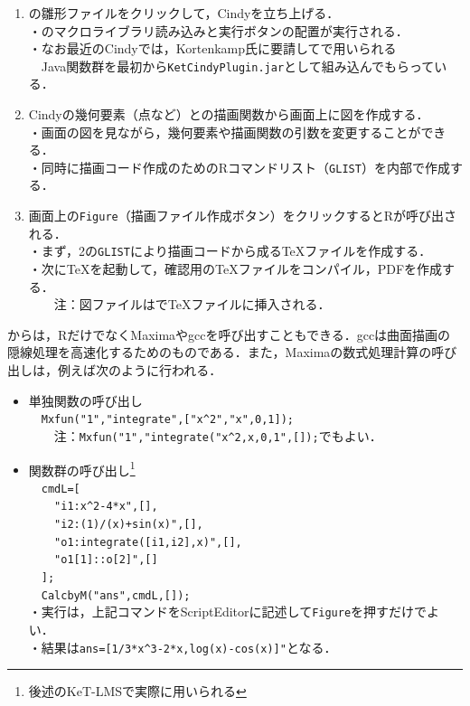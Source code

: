 \documentclass[a4j,12pt]{ujarticle}
\begin{document}
\begin{enumerate}
\item \ketcindy の雛形ファイルをクリックして，Cindyを立ち上げる．\\
・\ketcindy のマクロライブラリ読み込みと実行ボタンの配置が実行される．\\
・なお最近のCindyでは，Kortenkamp氏に要請して\ketcindy で用いられる\\
　Java関数群を最初から\verb|KetCindyPlugin.jar|として組み込んでもらっている．\vspace{-2mm}
\item Cindyの幾何要素（点など）と\ketcindy の描画関数から画面上に図を作成する．\\
・画面の図を見ながら，幾何要素や描画関数の引数を変更することができる．\\
・同時に描画コード作成のためのRコマンドリスト（\verb|GLIST|）を内部で作成する．

\vspace{-2mm}
\item 画面上の\verb|Figure|（描画ファイル作成ボタン）をクリックするとRが呼び出される．\\
・まず，2の\verb|GLIST|により描画コードから成る\TeX ファイルを作成する．\\
・次に\TeX を起動して，確認用の\TeX ファイルをコンパイル，PDFを作成する．\\
　　注：図ファイルは\verb||で\TeX ファイルに挿入される．\vspace{-1mm}
\end{enumerate}

\ketcindy からは，RだけでなくMaximaやgccを呼び出すこともできる．gccは\ketcindy 曲面描画の隠線処理を高速化するためのものである．また，Maximaの数式処理計算の呼び出しは，例えば次のように行われる．\vspace{-1mm}

\begin{itemize}
\item 単独関数の呼び出し\\
　\verb|Mxfun("1","integrate",["x^2","x",0,1]);|\\
　　注：\verb|Mxfun("1","integrate("x^2,x,0,1",[]);|でもよい．\vspace{-2mm}
\item 関数群の呼び出し\footnote{後述のKeT-LMSで実際に用いられる}\\
　\verb|cmdL=[|\\
　\verb|  "i1:x^2-4*x",[],|\\
　\verb|  "i2:(1)/(x)+sin(x)",[],|\\
　\verb|  "o1:integrate([i1,i2],x)",[],|\\
　\verb|  "o1[1]::o[2]",[]|\\
　\verb|];|\\
　\verb|CalcbyM("ans",cmdL,[]);|\\
・実行は，上記コマンドをScriptEditorに記述して\verb|Figure|を押すだけでよい．\\
・結果は\verb|ans=[1/3*x^3-2*x,log(x)-cos(x)]"|となる．\vspace{-1mm}
\end{itemize}
\end{document}

